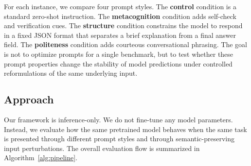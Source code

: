 \documentclass[11pt]{article}
\begin{document}
\begin{table}[h]
\centering
\small
{}
\caption{Statistics for the evaluation datasets. $N_{val}$ denotes the number of examples in the validation split. Majority denotes the accuracy of the majority-class baseline.}
\label{tab:datasets}
\end{table}

For each instance, we compare four prompt styles. The \textbf{control} condition is a standard zero-shot instruction. The \textbf{metacognition} condition adds self-check and verification cues. The \textbf{structure} condition constrains the model to respond in a fixed JSON format that separates a brief explanation from a final answer field. The \textbf{politeness} condition adds courteous conversational phrasing. The goal is not to optimize prompts for a single benchmark, but to test whether these prompt properties change the stability of model predictions under controlled reformulations of the same underlying input.

\subsection{Approach}

Our framework is inference-only. We do not fine-tune any model parameters. Instead, we evaluate how the same pretrained model behaves when the same task is presented through different prompt styles and through semantic-preserving input perturbations. The overall evaluation flow is summarized in Algorithm~\ref{alg:pipeline}.
\end{document}
